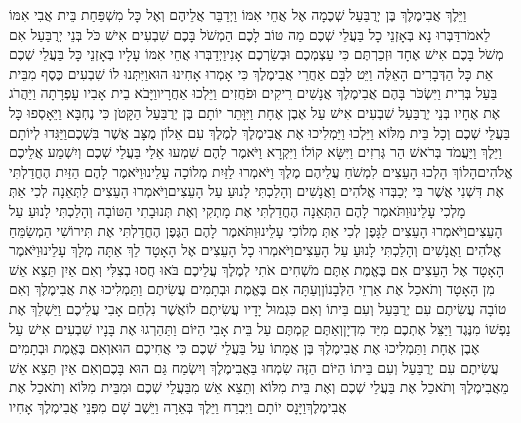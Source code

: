 \documentclass[../main/main.tex]{subfiles}
\begin{document}
\begin{multicols*}{\ncols}
וַיֵּלֶךְ אֲבִימֶלֶךְ בֶּן יְרֻבַּעַל שְׁכֶמָה אֶל אֲחֵי אִמּוֹ וַיְדַבֵּר אֲלֵיהֶם וְאֶל כָּל מִשְׁפַּחַת בֵּית אֲבִי אִמּוֹ לֵאמֹר\PreVerseSpace{}דַּבְּרוּ נָא בְּאָזְנֵי כָל בַּעֲלֵי שְׁכֶם מַה טּוֹב לָכֶם הַמְשֹׁל בָּכֶם שִׁבְעִים אִישׁ כֹּל בְּנֵי יְרֻבַּעַל אִם מְשֹׁל בָּכֶם אִישׁ אֶחָד וּזְכַרְתֶּם כִּי עַצְמְכֶם וּבְשַׂרְכֶם אָנִי\PreVerseSpace{}וַיְדַבְּרוּ אֲחֵי אִמּוֹ עָלָיו בְּאָזְנֵי כָּל בַּעֲלֵי שְׁכֶם אֵת כָּל הַדְּבָרִים הָאֵלֶּה וַיֵּט לִבָּם אַחֲרֵי אֲבִימֶלֶךְ כִּי אָמְרוּ אָחִינוּ הוּא\PreVerseSpace{}וַיִּתְּנוּ לוֹ שִׁבְעִים כֶּסֶף מִבֵּית בַּעַל בְּרִית וַיִּשְׂכֹּר בָּהֶם אֲבִימֶלֶךְ אֲנָשִׁים רֵיקִים וּפֹחֲזִים וַיֵּלְכוּ אַחֲרָיו\PreVerseSpace{}וַיָּבֹא בֵית אָבִיו עָפְרָתָה וַיַּהֲרֹג אֶת אֶחָיו בְּנֵי יְרֻבַּעַל שִׁבְעִים אִישׁ עַל אֶבֶן אֶחָת וַיִּוָּתֵר יוֹתָם בֶּן יְרֻבַּעַל הַקָּטֹן כִּי נֶחְבָּא \ClosedSection{}וַיֵּאָסְפוּ כָּל בַּעֲלֵי שְׁכֶם וְכָל בֵּית מִלּוֹא וַיֵּלְכוּ וַיַּמְלִיכוּ אֶת אֲבִימֶלֶךְ לְמֶלֶךְ עִם אֵלוֹן מֻצָּב אֲשֶׁר בִּשְׁכֶם\PreVerseSpace{}וַיַּגִּדוּ לְיוֹתָם וַיֵּלֶךְ וַיַּעֲמֹד בְּרֹאשׁ הַר גְּרִזִים וַיִּשָּׂא קוֹלוֹ וַיִּקְרָא וַיֹּאמֶר לָהֶם שִׁמְעוּ אֵלַי בַּעֲלֵי שְׁכֶם וְיִשְׁמַע אֲלֵיכֶם אֱלֹהִים\PreVerseSpace{}הָלוֹךְ הָלְכוּ הָעֵצִים לִמְשֹׁחַ עֲלֵיהֶם מֶלֶךְ וַיֹּאמְרוּ לַזַּיִת מְלוֹכָה עָלֵינוּ\PreVerseSpace{}וַיֹּאמֶר לָהֶם הַזַּיִת הֶחֳדַלְתִּי אֶת דִּשְׁנִי אֲשֶׁר בִּי יְכַבְּדוּ אֱלֹהִים וַאֲנָשִׁים וְהָלַכְתִּי לָנוּעַ עַל הָעֵצִים\PreVerseSpace{}וַיֹּאמְרוּ הָעֵצִים לַתְּאֵנָה לְכִי אַתְּ מָלְכִי עָלֵינוּ\PreVerseSpace{}וַתֹּאמֶר לָהֶם הַתְּאֵנָה הֶחֳדַלְתִּי אֶת מָתְקִי וְאֶת תְּנוּבָתִי הַטּוֹבָה וְהָלַכְתִּי לָנוּעַ עַל הָעֵצִים\PreVerseSpace{}וַיֹּאמְרוּ הָעֵצִים לַגָּפֶן לְכִי אַתְּ מְלוֹכִי עָלֵינוּ\PreVerseSpace{}וַתֹּאמֶר לָהֶם הַגֶּפֶן הֶחֳדַלְתִּי אֶת תִּירוֹשִׁי הַמְשַׂמֵּחַ אֱלֹהִים וַאֲנָשִׁים וְהָלַכְתִּי לָנוּעַ עַל הָעֵצִים\PreVerseSpace{}וַיֹּאמְרוּ כָל הָעֵצִים אֶל הָאָטָד לֵךְ אַתָּה מְלָךְ עָלֵינוּ\PreVerseSpace{}וַיֹּאמֶר הָאָטָד אֶל הָעֵצִים אִם בֶּאֱמֶת אַתֶּם מֹשְׁחִים אֹתִי לְמֶלֶךְ עֲלֵיכֶם בֹּאוּ חֲסוּ בְצִלִּי וְאִם אַיִן תֵּצֵא אֵשׁ מִן הָאָטָד וְתֹאכַל אֶת אַרְזֵי הַלְּבָנוֹן\PreVerseSpace{}וְעַתָּה אִם בֶּאֱמֶת וּבְתָמִים עֲשִׂיתֶם וַתַּמְלִיכוּ אֶת אֲבִימֶלֶךְ וְאִם טוֹבָה עֲשִׂיתֶם עִם יְרֻבַּעַל וְעִם בֵּיתוֹ וְאִם כִּגְמוּל יָדָיו עֲשִׂיתֶם לוֹ\PreVerseSpace{}אֲשֶׁר נִלְחַם אָבִי עֲלֵיכֶם וַיַּשְׁלֵךְ אֶת נַפְשׁוֹ מִנֶּגֶד וַיַּצֵּל אֶתְכֶם מִיַּד מִדְיָן\PreVerseSpace{}וְאַתֶּם קַמְתֶּם עַל בֵּית אָבִי הַיּוֹם וַתַּהַרְגוּ אֶת בָּנָיו שִׁבְעִים אִישׁ עַל אֶבֶן אֶחָת וַתַּמְלִיכוּ אֶת אֲבִימֶלֶךְ בֶּן אֲמָתוֹ עַל בַּעֲלֵי שְׁכֶם כִּי אֲחִיכֶם הוּא\PreVerseSpace{}וְאִם בֶּאֱמֶת וּבְתָמִים עֲשִׂיתֶם עִם יְרֻבַּעַל וְעִם בֵּיתוֹ הַיּוֹם הַזֶּה שִׂמְחוּ בַּאֲבִימֶלֶךְ וְיִשְׂמַח גַּם הוּא בָּכֶם\PreVerseSpace{}וְאִם אַיִן תֵּצֵא אֵשׁ מֵאֲבִימֶלֶךְ וְתֹאכַל אֶת בַּעֲלֵי שְׁכֶם וְאֶת בֵּית מִלּוֹא וְתֵצֵא אֵשׁ מִבַּעֲלֵי שְׁכֶם וּמִבֵּית מִלּוֹא וְתֹאכַל אֶת אֲבִימֶלֶךְ\PreVerseSpace{}וַיָּנָס יוֹתָם וַיִּבְרַח וַיֵּלֶךְ בְּאֵרָה וַיֵּשֶׁב שָׁם מִפְּנֵי אֲבִימֶלֶךְ אָחִיו\OpenSection{}\par

\end{multicols*}
\end{document}
